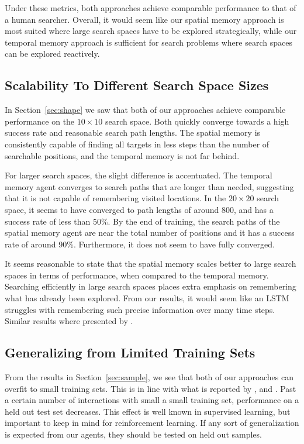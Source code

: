 Under these metrics, both approaches achieve comparable performance to that of a human searcher. 
Overall, it would seem like our spatial memory approach is most suited where large search spaces have to be explored strategically, while our temporal memory approach is sufficient for search problems where search spaces can be explored reactively.

\subsection{Scalability To Different Search Space Sizes}

In Section~\ref{sec:shape} we saw that both of our approaches achieve comparable performance on the \(10 \times 10\) search space.
Both quickly converge towards a high success rate and reasonable search path lengths.
The spatial memory is consistently capable of finding all targets in less steps than the number of searchable positions, and the temporal memory is not far behind.

For larger search spaces, the slight difference is accentuated.
The temporal memory agent converges to search paths that are longer than needed, suggesting that it is not capable of remembering visited locations.
In the \(20 \times 20\) search space, it seems to have converged to path lengths of around 800, and has a success rate of less than 50\%.
By the end of training, the search paths of the spatial memory agent are near the total number of positions and it has a success rate of around 90\%.
Furthermore, it does not seem to have fully converged.

It seems reasonable to state that the spatial memory scales better to large search spaces in terms of performance, when compared to the temporal memory.
Searching efficiently in large search spaces places extra emphasis on remembering what has already been explored.
From our results, it would seem like an LSTM struggles with remembering such precise information over many time steps.
Similar results where presented by \cite{oh_minecraft_2016}.

\subsection{Generalizing from Limited Training Sets}

From the results in Section~\ref{sec:sample}, we see that both of our approaches can overfit to small training sets.
This is in line with what is reported by \cite{cobbe_procgen_2020}, \cite{cobbe_generalization_2019} and \cite{zhang_overfitting_2018}.
Past a certain number of interactions with small a small training set, performance on a held out test set decreases.
This effect is well known in supervised learning, but important to keep in mind for reinforcement learning.
If any sort of generalization is expected from our agents, they should be tested on held out samples.

